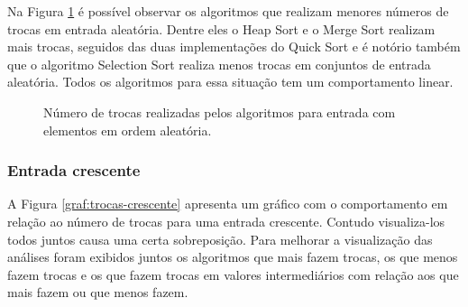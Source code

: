 \documentclass[conference,onecolumn]{IEEEtran}
\begin{document}
Na Figura \ref{graf:trocas-aleatoria-menores} é possível observar os algoritmos que realizam menores números de trocas em entrada aleatória. Dentre eles o Heap Sort e o Merge Sort realizam mais trocas, seguidos das duas implementações do Quick Sort e é notório também que o algoritmo Selection Sort realiza menos trocas em conjuntos de entrada aleatória. Todos os algoritmos para essa situação tem um comportamento linear.

\begin{figure}[H]
\begin{center}
\end{center}
\caption{Número de trocas realizadas pelos algoritmos para entrada com elementos em ordem aleatória.}
\label{graf:trocas-aleatoria-menores}
\end{figure}

\subsubsection{Entrada crescente}

A Figura \ref{graf:trocas-crescente} apresenta um gráfico com o comportamento em relação ao número de trocas para uma entrada crescente. Contudo visualiza-los todos juntos causa uma certa sobreposição. Para melhorar a visualização das análises foram exibidos juntos os algoritmos que mais fazem trocas, os que menos fazem trocas e os que fazem trocas em valores intermediários com relação aos que mais fazem ou que menos fazem.
\end{document}
